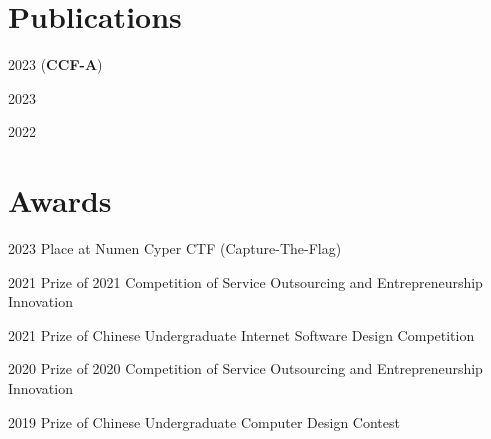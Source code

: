 \documentclass[12pt,letterpaper]{report}
\begin{document}
    \section*{Publications}
    \begin{tablist}
        \item[2023] \tab{} (\textbf{CCF-A})
        \item[2023] \tab{}
        \item[2022] \tab{}
    \end{tablist}


    \section*{Awards}
    \begin{tablist}
        \item[2023] \tab{} Place at Numen Cyper CTF (Capture-The-Flag)
        \item[2021] \tab{} Prize of 2021 Competition of Service Outsourcing and Entrepreneurship Innovation
        \item[2021] \tab{} Prize of Chinese Undergraduate Internet Software Design Competition
        \item[2020] \tab{} Prize of 2020 Competition of Service Outsourcing and Entrepreneurship Innovation
        \item[2019] \tab{} Prize of Chinese Undergraduate Computer Design Contest
    \end{tablist}
\end{document}
